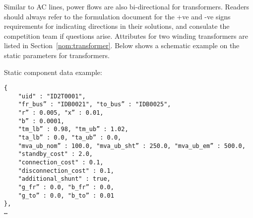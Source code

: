 Similar to AC lines, power flows are also bi-directional for transformers. 
Readers should always refer to the formulation document for the +ve and -ve signs
requirements for indicating directions in their solutions,
and consulate the competition team if questions arise.
Attributes for two winding transformers are listed in Section~\ref{nom:transformer}.
Below shows a schematic example on the static parameters for transformers.

Static component data example:
\begin{verbatim}
{
    "uid" : "ID2T0001",
    "fr_bus” : "IDB0021", "to_bus” : "IDB0025",
    "r” : 0.005, "x” : 0.01, 
    "b” : 0.0001,
    "tm_lb” : 0.98, "tm_ub” : 1.02, 
    "ta_lb” : 0.0, "ta_ub” : 0.0, 
    "mva_ub_nom” : 100.0, "mva_ub_sht” : 250.0, "mva_ub_em” : 500.0,
    "standby_cost" : 2.0,
    "connection_cost" : 0.1,
    "disconnection_cost" : 0.1,
    "additional_shunt" : true,
    "g_fr” : 0.0, "b_fr” : 0.0,
    "g_to” : 0.0, "b_to” : 0.01    
},
…     
\end{verbatim}



